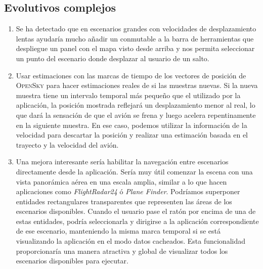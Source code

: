\documentclass[a4paper, 11pt]{book}
\begin{document}
\subsection{Evolutivos complejos}
\begin{enumerate}
		\item Se ha detectado que en escenarios grandes con velocidades de desplazamiento lentas ayudaría mucho añadir un conmutable a la barra de herramientas que despliegue un panel con el mapa visto desde arriba y nos permita seleccionar un punto del escenario donde desplazar al usuario de un salto.
		\item Usar estimaciones con las marcas de tiempo de los vectores de posición de \textsc{OpenSky} para hacer estimaciones reales de si las muestras nuevas.
		Si la nueva muestra tiene un intervalo temporal más pequeño que el utilizado por la aplicación, la posición mostrada reflejará un desplazamiento menor al real, lo que dará la sensación de que el avión se frena y luego acelera repentinamente en la siguiente muestra. En ese caso, podemos utilizar la información de la velocidad para descartar la posición y realizar una estimación basada en el trayecto y la velocidad del avión.
		\item Una mejora interesante sería habilitar la navegación entre escenarios directamente desde la aplicación. Sería muy útil comenzar la escena con una vista panorámica aérea en una escala amplia, similar a lo que hacen aplicaciones como \emph{FlightRadar24} ó \emph{Plane Finder}. Podríamos superponer entidades rectangulares transparentes que representen las áreas de los escenarios disponibles. Cuando el usuario pase el ratón por encima de una de estas entidades, podría seleccionarla y dirigirse a la aplicación correspondiente de ese escenario, manteniendo la misma marca temporal si se está visualizando la aplicación en el modo datos cacheados. Esta funcionalidad proporcionaría una manera atractiva y global de visualizar todos los escenarios disponibles para ejecutar.
\end{enumerate}


\nocite{*}


\end{document}
